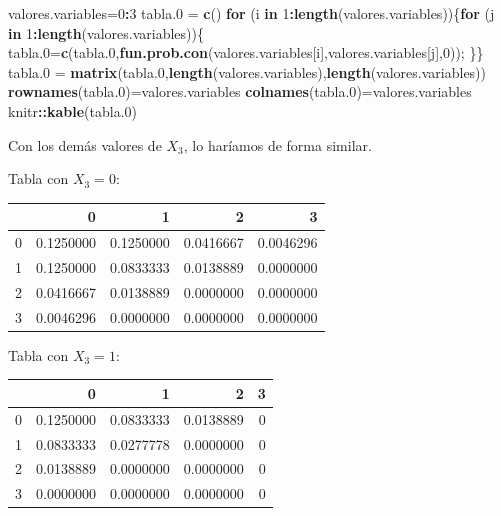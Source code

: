\documentclass[]{book}
\newenvironment{Shaded}{\begin{snugshade}}{\end{snugshade}}
\newcommand{\ControlFlowTok}[1]{\textcolor[rgb]{0.13,0.29,0.53}{\textbf{#1}}}
\newcommand{\DecValTok}[1]{\textcolor[rgb]{0.00,0.00,0.81}{#1}}
\newcommand{\FloatTok}[1]{\textcolor[rgb]{0.00,0.00,0.81}{#1}}
\newcommand{\KeywordTok}[1]{\textcolor[rgb]{0.13,0.29,0.53}{\textbf{#1}}}
\newcommand{\NormalTok}[1]{#1}
\newcommand{\OperatorTok}[1]{\textcolor[rgb]{0.81,0.36,0.00}{\textbf{#1}}}
\newcommand{\StringTok}[1]{\textcolor[rgb]{0.31,0.60,0.02}{#1}}
\begin{document}
\begin{Shaded}
\begin{Highlighting}[]
\NormalTok{valores.variables=}\DecValTok{0}\OperatorTok{:}\DecValTok{3}
\NormalTok{tabla}\FloatTok{.0}\NormalTok{ =}\StringTok{ }\KeywordTok{c}\NormalTok{()}
\ControlFlowTok{for}\NormalTok{ (i }\ControlFlowTok{in} \DecValTok{1}\OperatorTok{:}\KeywordTok{length}\NormalTok{(valores.variables))\{}\ControlFlowTok{for}\NormalTok{ (j }\ControlFlowTok{in} \DecValTok{1}\OperatorTok{:}\KeywordTok{length}\NormalTok{(valores.variables))\{}
\NormalTok{  tabla}\FloatTok{.0}\NormalTok{=}\KeywordTok{c}\NormalTok{(tabla}\FloatTok{.0}\NormalTok{,}\KeywordTok{fun.prob.con}\NormalTok{(valores.variables[i],valores.variables[j],}\DecValTok{0}\NormalTok{));}
\NormalTok{\}\}}
\NormalTok{tabla}\FloatTok{.0}\NormalTok{ =}\StringTok{ }\KeywordTok{matrix}\NormalTok{(tabla}\FloatTok{.0}\NormalTok{,}\KeywordTok{length}\NormalTok{(valores.variables),}\KeywordTok{length}\NormalTok{(valores.variables))}
\KeywordTok{rownames}\NormalTok{(tabla}\FloatTok{.0}\NormalTok{)=valores.variables}
\KeywordTok{colnames}\NormalTok{(tabla}\FloatTok{.0}\NormalTok{)=valores.variables}
\NormalTok{knitr}\OperatorTok{::}\KeywordTok{kable}\NormalTok{(tabla}\FloatTok{.0}\NormalTok{)}
\end{Highlighting}
\end{Shaded}

Con los demás valores de \(X_3\), lo haríamos de forma similar.

Tabla con \(X_3=0\):

\begin{tabular}{l|r|r|r|r}
\hline
  & 0 & 1 & 2 & 3\\
\hline
0 & 0.1250000 & 0.1250000 & 0.0416667 & 0.0046296\\
\hline
1 & 0.1250000 & 0.0833333 & 0.0138889 & 0.0000000\\
\hline
2 & 0.0416667 & 0.0138889 & 0.0000000 & 0.0000000\\
\hline
3 & 0.0046296 & 0.0000000 & 0.0000000 & 0.0000000\\
\hline
\end{tabular}

Tabla con \(X_3=1\):

\begin{tabular}{l|r|r|r|r}
\hline
  & 0 & 1 & 2 & 3\\
\hline
0 & 0.1250000 & 0.0833333 & 0.0138889 & 0\\
\hline
1 & 0.0833333 & 0.0277778 & 0.0000000 & 0\\
\hline
2 & 0.0138889 & 0.0000000 & 0.0000000 & 0\\
\hline
3 & 0.0000000 & 0.0000000 & 0.0000000 & 0\\
\hline
\end{tabular}
\end{document}
